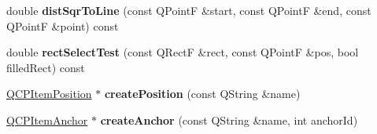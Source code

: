 \begin{DoxyCompactItemize}
\item 
double {\bfseries dist\+Sqr\+To\+Line} (const Q\+PointF \&start, const Q\+PointF \&end, const Q\+PointF \&point) const \hypertarget{class_q_c_p_abstract_item_acdca343717d625b8abb3c3e38c0ed39d}{}\label{class_q_c_p_abstract_item_acdca343717d625b8abb3c3e38c0ed39d}

\item 
double {\bfseries rect\+Select\+Test} (const Q\+RectF \&rect, const Q\+PointF \&pos, bool filled\+Rect) const \hypertarget{class_q_c_p_abstract_item_a4c0e14c4e92df91174cb7183fb363069}{}\label{class_q_c_p_abstract_item_a4c0e14c4e92df91174cb7183fb363069}

\item 
\hyperlink{class_q_c_p_item_position}{Q\+C\+P\+Item\+Position} $\ast$ {\bfseries create\+Position} (const Q\+String \&name)\hypertarget{class_q_c_p_abstract_item_a75036d39c4d4e2e1a7dd145fff915d32}{}\label{class_q_c_p_abstract_item_a75036d39c4d4e2e1a7dd145fff915d32}

\item 
\hyperlink{class_q_c_p_item_anchor}{Q\+C\+P\+Item\+Anchor} $\ast$ {\bfseries create\+Anchor} (const Q\+String \&name, int anchor\+Id)\hypertarget{class_q_c_p_abstract_item_af3fc92527802078ca395138748b629a7}{}\label{class_q_c_p_abstract_item_af3fc92527802078ca395138748b629a7}

\end{DoxyCompactItemize}
